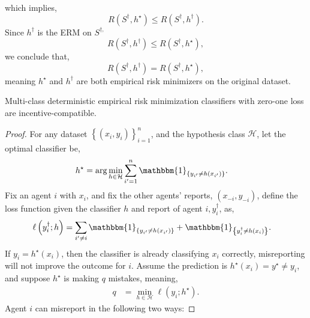 \documentclass{article}
\begin{document}
which implies,
\begin{equation} 
R\left(S^{\dagger}, h^\star \right) \leq  R\left(S^{\dagger}, h^{\dagger}\right).
\end{equation}
Since $h^{\dagger}$ is the ERM on $S^{\dagger,}$
\begin{equation} 
R\left(S^{\dagger}, h^{\dagger}\right) \leq  R\left(S^{\dagger}, h^\star \right),
\end{equation}
we conclude that,
\begin{equation} 
R\left(S^{\dagger}, h^{\dagger}\right) = R\left(S^{\dagger}, h^\star \right),
\end{equation}
meaning $h^\star $ and $h^{\dagger}$ are both empirical risk minimizers on the original dataset.
\newline \newline
\begin{prop} \label{prop:zolog} 
Multi-class deterministic empirical risk minimization classifiers with zero-one loss are incentive-compatible.
\end{prop}
\begin{proof} \label{proof:zologpf} 
For any dataset $\left\{\left(x_{i}, y_{i}\right)\right\}_{i=1}^{n}$, and the hypothesis class $\mathcal{H}$, let the optimal classifier be,
\begin{align*}
h^\star  &= \arg\displaystyle\min_{h \in \mathcal{H}} \displaystyle\sum_{i'=1}^{n} \mathbbm{1}_{\left\{y_{i'} \neq  h\left(x_{i'}\right)\right\}}.
\end{align*}
Fix an agent $i $ with $x_{i}$, and fix the other agents' reports, $\left(x_{-i}, y_{-i}\right)$, define the loss function given the classifier $h $ and report of agent $i , y^{\dagger}_{i}$, as,
\begin{align*}
\ell\left(y^{\dagger}_{i}; h\right) &= \displaystyle\sum_{i' \neq  i} \mathbbm{1}_{\left\{y_{i'} \neq  h\left(x_{i'}\right)\right\}} + \mathbbm{1}_{\left\{y^{\dagger}_{i} \neq  h\left(x_{i}\right)\right\}}.
\end{align*}
If $y_{i} = h^\star \left(x_{i}\right)$, then the classifier is already classifying $x_{i}$ correctly, misreporting will not improve the outcome for $i $. Assume the prediction is $h^\star \left(x_{i}\right) = y^\star  \neq  y_{i}$, and suppose $h^\star $ is making $q $ mistakes, meaning,
\begin{align*}
q  &= \displaystyle\min_{h \in \mathcal{H}} \ell\left(y_{i} ; h^\star \right).
\end{align*}
Agent $i $ can misreport in the following two ways:
\end{proof}
\end{document}
